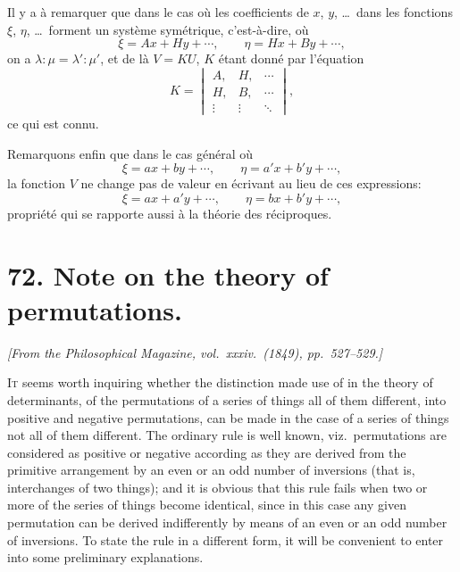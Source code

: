 \documentclass[11pt,a4paper]{book}
\begin{document}
Il y a \`{a} remarquer que dans le cas o\`{u} les coefficients de $x$, $y$, \ldots\ dans les fonctions $\xi$, $\eta$, \ldots\ forment un syst\`{e}me sym\'{e}trique, c'est-\`{a}-dire, o\`{u}
\[
\xi = Ax + Hy + \cdots, \qquad \eta = Hx + By + \cdots,
\]
on a $\lambda:\mu = \lambda':\mu'$, et de l\`{a} $V = KU$, $K$ \'{e}tant donn\'{e} par l'\'{e}quation
\[
K = \begin{vmatrix}
A, & H, & \cdots \\
H, & B, & \cdots \\
\vdots & \vdots & \ddots
\end{vmatrix},
\]
ce qui est connu.

Remarquons enfin que dans le cas g\'{e}n\'{e}ral o\`{u}
\[
\xi = ax + by + \cdots, \qquad \eta = a'x + b'y + \cdots,
\]
la fonction $V$ ne change pas de valeur en \'{e}crivant au lieu de ces expressions:
\[
\xi = ax + a'y + \cdots, \qquad \eta = bx + b'y + \cdots,
\]
propri\'{e}t\'{e} qui se rapporte aussi \`{a} la th\'{e}orie des r\'{e}ciproques.



\newpage
\section*{72. Note on the theory of permutations.}

\begin{flushright}
\textit{[From the Philosophical Magazine, vol.\ xxxiv.\ (1849), pp.\ 527--529.]}
\end{flushright}

\setcounter{page}{423}

\textsc{It} seems worth inquiring whether the distinction made use of in the theory of determinants, of the permutations of a series of things all of them different, into positive and negative permutations, can be made in the case of a series of things not all of them different. The ordinary rule is well known, viz.\ permutations are considered as positive or negative according as they are derived from the primitive arrangement by an even or an odd number of inversions (that is, interchanges of two things); and it is obvious that this rule fails when two or more of the series of things become identical, since in this case any given permutation can be derived indifferently by means of an even or an odd number of inversions. To state the rule in a different form, it will be convenient to enter into some preliminary explanations.
\end{document}
